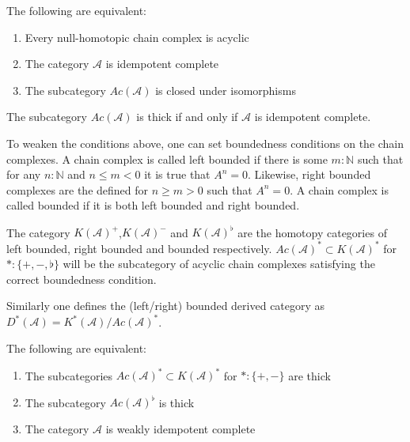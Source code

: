     \begin{lemma}
        The following are equivalent:
        \begin{enumerate}
            \item Every null-homotopic chain complex is acyclic
            \item The category $\mathcal{A}$ is idempotent complete
            \item The subcategory $Ac(\mathcal{A})$ is closed under isomorphisms
        \end{enumerate}
    \end{lemma}

    \begin{corollary}
        The subcategory $Ac(\mathcal{A})$ is thick if and only if $\mathcal{A}$ is idempotent complete.
    \end{corollary}

    To weaken the conditions above, one can set boundedness conditions on the chain complexes. A chain complex is called left bounded if there is some $m:\mathbb{N}$ such that for any $n:\mathbb{N}$ and $n\leq m<0$ it is true that $A^n = 0$. Likewise, right bounded complexes are the defined for $n\geq m>0$ such that $A^n=0$. A chain complex is called bounded if it is both left bounded and right bounded.

    \begin{definition}
        The category $K(\mathcal{A})^+$,$K(\mathcal{A})^-$ and $K(\mathcal{A})^{\flat}$ are the homotopy categories of left bounded, right bounded and bounded respectively. $Ac(\mathcal{A})^* \subset K(\mathcal{A})^*$ for $*:\{+,-,\flat\}$ will be the subcategory of acyclic chain complexes satisfying the correct boundedness condition.
        
        Similarly one defines the (left/right) bounded derived category as $D^*(\mathcal{A}) = K^*(\mathcal{A})/Ac(\mathcal{A})^*$.
    \end{definition}
        
    \begin{lemma}
        The following are equivalent:
        \begin{enumerate}
            \item The subcategories $Ac(\mathcal{A})^* \subset K(\mathcal{A})^*$ for $*:\{+,-\}$ are thick
            \item The subcategory $Ac(\mathcal{A})^{\flat}$ is thick
            \item The category $\mathcal{A}$ is weakly idempotent complete
        \end{enumerate}
    \end{lemma}

